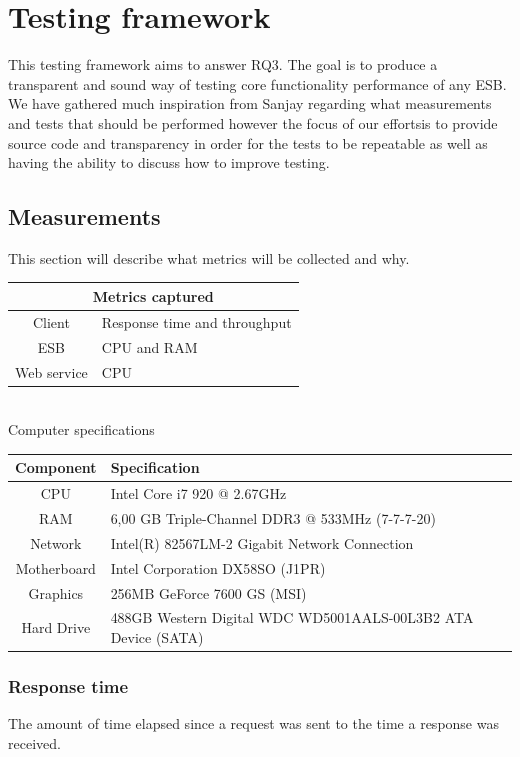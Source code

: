 \section{Testing framework}
This testing framework aims to answer RQ3. The goal is to produce a transparent and sound way of testing core functionality \cite{lit review} performance of any ESB. 
We have gathered much inspiration from Sanjay \cite{Sanjay} regarding what measurements and tests that should be performed however the focus of our effortsis to provide source code and transparency in order for the tests to be repeatable as well as having the ability to discuss how to improve testing.

\subsection{Measurements}
This section will describe what metrics will be collected and why.\\

\begin{tabular}{| c | l |}
	\hline
	\multicolumn{2}{|c|}{Metrics captured} \\
	\hline
	Client & Response time and throughput \\ \hline
	ESB & CPU and RAM \\ \hline
	Web service &  CPU \\ \hline
\end{tabular} \\

Computer specifications \\

\begin{tabular}{| c | l |}
	\hline
	Component & Specification \\ \hline
	CPU & Intel Core i7 920 @ 2.67GHz  \\ \hline
	RAM &  6,00 GB Triple-Channel DDR3 @ 533MHz (7-7-7-20) \\ \hline
	Network &  Intel(R) 82567LM-2 Gigabit Network Connection \\ \hline
	Motherboard &  Intel Corporation DX58SO (J1PR) \\ \hline
	Graphics &  256MB GeForce 7600 GS (MSI) \\ \hline
	Hard Drive &  488GB Western Digital WDC WD5001AALS-00L3B2 ATA Device (SATA) \\ \hline
\end{tabular} 
\subsubsection{Response time}
The amount of time elapsed since a request was sent to the time a response was received.
